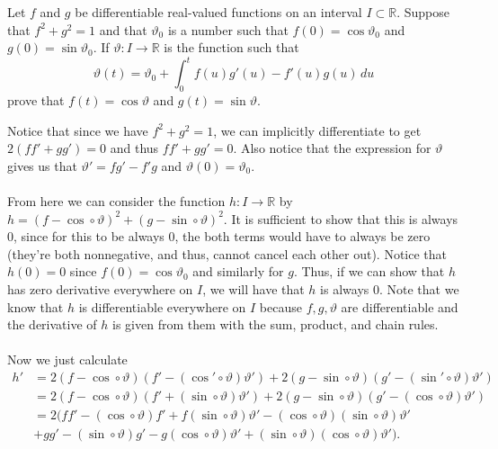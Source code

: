 \documentclass[12 pt, letterpaper]{hmcpset}
\begin{document}
\pagebreak

\begin{problem}[Problem 4.]
	Let $f$ and $g$ be differentiable real-valued functions on an interval $I \subset \mathbb{R}$. Suppose that $f^2 + g^2 = 1$ and that $\vartheta_0$ is a number such that $f(0) = \cos \vartheta_0$ and $g(0) = \sin \vartheta_0$. If $\vartheta : I \to \mathbb{R}$ is the function such that
	\[
		\vartheta(t) = \vartheta_0 + \int_0^t f(u) g'(u) - f'(u) g(u) \, du
	\] 
	prove that $f(t) = \cos \vartheta$ and $g(t) = \sin \vartheta$.
\end{problem}

\begin{solution}
	Notice that since we have $f^2 + g^2 = 1$, we can implicitly differentiate to get $2 (f f' + g g') = 0$ and thus $f f' + g g' = 0$. Also notice that the expression for $\vartheta$ gives us that $\vartheta' = f g' - f' g$ and $\vartheta(0) = \vartheta_0$. \\\\
	From here we can consider the function $h : I \to \mathbb{R}$ by $h = (f - \cos \circ \vartheta)^2 + (g - \sin \circ \vartheta)^2$. It is sufficient to show that this is always $0$, since for this to be always $0$, the both terms would have to always be zero (they're both nonnegative, and thus, cannot cancel each other out). Notice that $h(0) = 0$ since $f(0) = \cos \vartheta_0$ and similarly for $g$. Thus, if we can show that $h$ has zero derivative everywhere on $I$, we will have that $h$ is always $0$. Note that we know that $h$ is differentiable everywhere on $I$ because $f, g, \vartheta$ are differentiable and the derivative of $h$ is given from them with the sum, product, and chain rules. \\\\
	Now we just calculate
	\[
		\begin{split}
			h' & = 2 (f - \cos \circ \vartheta)(f' - (\cos' \circ \vartheta) \vartheta') + 2(g - \sin \circ \vartheta)(g' - (\sin' \circ \vartheta) \vartheta') \\
			   & = 2 (f - \cos \circ \vartheta)(f' + (\sin \circ \vartheta) \vartheta') + 2(g - \sin \circ \vartheta)(g' - (\cos \circ \vartheta) \vartheta') \\
			   & = 2 (f f' - (\cos \circ \vartheta) f' + f (\sin \circ \vartheta) \vartheta' - (\cos \circ \vartheta) (\sin \circ \vartheta) \vartheta' \\ 
			   & + g g' - (\sin \circ \vartheta) g' - g (\cos \circ \vartheta) \vartheta' + (\sin \circ \vartheta) (\cos \circ \vartheta) \vartheta').

\end{split}\]
\end{solution}
\end{document}
